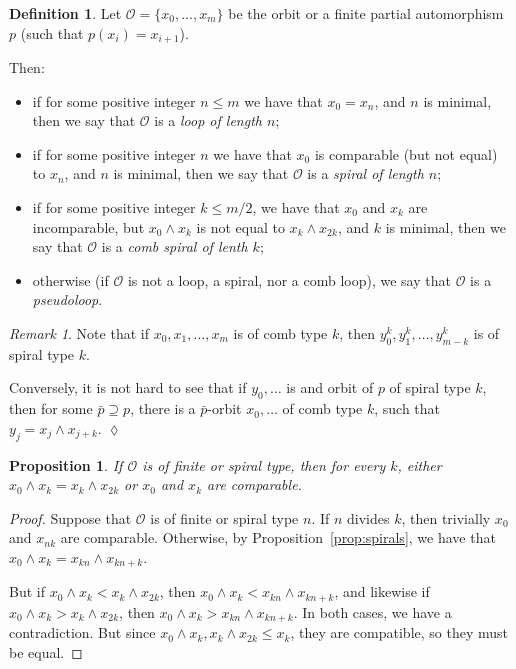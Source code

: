 \documentclass[final,a4paper,12pt,reqno]{amsart}
\newcommand{\meet}{\mathop{\wedge}}
\newtheorem{prop}[thm]{Proposition}
\theoremstyle{remark}
\newtheorem{rem}[thm]{Remark}
\theoremstyle{definition}
\newtheorem{dfn}[thm]{Definition}
\newcommand{\xqed}[1]{%
	\leavevmode\unskip\penalty9999 \hbox{}\nobreak\hfill
	\quad\hbox{\ensuremath{#1}}}
\let \leq \leqslant
\begin{document}
	\begin{dfn}
		Let $\mathcal O=\{x_0,\ldots, x_m\}$ be the orbit or a finite partial automorphism $p$ (such that $p(x_i)=x_{i+1}$).
		
		Then:
		\begin{itemize}
			\item
			if for some positive integer $n\leq m$ we have that $x_0=x_n$, and $n$ is minimal, then we say that $\mathcal O$ is a \emph{loop of length $n$};
			\item 
			if for some positive integer $n$ we have that $x_0$ is comparable (but not equal) to $x_n$, and $n$ is minimal, then we say that $\mathcal O$ is a \emph{spiral of length $n$};
			\item
			if for some positive integer $k\leq m/2$, we have that $x_0$ and $x_k$ are incomparable, but $x_0\meet x_k$ is not equal to $x_k\meet x_{2k}$, and $k$ is minimal, then we say that $\mathcal O$ is a \emph{comb spiral of lenth $k$};
			\item
			otherwise (if $\mathcal O$ is not a loop, a spiral, nor a comb loop), we say that $\mathcal O$ is a \emph{pseudoloop}.
		\end{itemize}
	\end{dfn}
	
	\begin{rem}
		Note that if $x_0,x_1,\ldots, x_m$ is of comb type $k$, then $y^k_0,y^k_1,\ldots, y^k_{m-k}$ is of spiral type $k$.
		
		Conversely, it is not hard to see that if $y_0,\ldots$ is and orbit of $p$ of spiral type $k$, then for some $\bar p\supseteq p$, there is a $\bar p$-orbit $x_0,\ldots$ of comb type $k$, such that $y_j=x_j\meet x_{j+k}$.\xqed{\lozenge}
	\end{rem}
	
	\begin{prop}
		\label{prop:finite_spiral_not_comb}
		If $\mathcal O$ is of finite or spiral type, then for every $k$, either $x_0\meet x_k=x_k\meet x_{2k}$ or $x_0$ and $x_k$ are comparable.
	\end{prop}
	\begin{proof}
		Suppose that $\mathcal O$ is of finite or spiral type $n$. If $n$ divides $k$, then trivially $x_0$ and $x_{nk}$ are comparable. Otherwise, by Proposition~\ref{prop:spirals}, we have that $x_0\meet x_k=x_{kn}\meet x_{kn+k}$.
		
		But if $x_0\meet x_k<x_k\meet x_{2k}$, then $x_0\meet x_k<x_{kn}\meet x_{kn+k}$, and likewise if $x_0\meet x_k>x_k\meet x_{2k}$, then $x_0\meet x_k>x_{kn}\meet x_{kn+k}$. In both cases, we have a contradiction. But since $x_0\meet x_k, x_k\meet x_{2k}\leq x_k$, they are compatible, so they must be equal.
	\end{proof}
	
\end{document}
